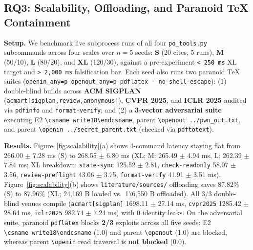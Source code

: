 \subsection{RQ3: Scalability, Offloading, and Paranoid TeX Containment}\label{sec:exp-rq3}

\textbf{Setup.} We benchmark live subprocess runs of all four \texttt{po\_\allowbreak{}tools.\allowbreak{}py} subcommands across four scales over \(n=5\) seeds: \textbf{S} (20 cites, 5 runs), \textbf{M} (50/10), \textbf{L} (80/20), and \textbf{XL} (120/30), against a pre-experiment \texttt{\textless{}\ 250\ ms} XL target and \texttt{\textgreater{}\ 2,\allowbreak{}000\ ms} falsification bar. Each seed also runs two paranoid TeX suites (\texttt{openin\_\allowbreak{}any=p\ openout\_\allowbreak{}any=p\ pdflatex\ \mbox{-{}-}no-\allowbreak{}shell-escape}): (1) double-blind builds across \textbf{ACM SIGPLAN} (\texttt{acmart{[}sigplan,\allowbreak{}review,\allowbreak{}anonymous{]}}), \textbf{CVPR 2025}, and \textbf{ICLR 2025} audited via \texttt{pdfinfo} and \texttt{format-verify}; and (2) a \textbf{3-vector adversarial suite} executing E2 \texttt{\textbackslash{}csname\ write18\textbackslash{}endcsname}, parent \texttt{\textbackslash{}openout\ ../\allowbreak{}pwn\_\allowbreak{}out.\allowbreak{}txt}, and parent \texttt{\textbackslash{}openin\ ../\allowbreak{}secret\_\allowbreak{}parent.\allowbreak{}txt} (checked via \texttt{pdftotext}).

\textbf{Results.} Figure~\ref{fig:scalability}(a) shows 4-command latency staying flat from 266.00 \(\pm\) 7.28 ms (S) to 268.55 \(\pm\) 6.80 ms (XL; M: 265.49 \(\pm\) 4.94 ms, L: 262.39 \(\pm\) 7.84 ms; XL breakdown: \texttt{state-sync} 125.52 \(\pm\) 2.81, \texttt{check-readonly} 58.07 \(\pm\) 3.56, \texttt{review-preflight} 43.06 \(\pm\) 3.75, \texttt{format-verify} 41.91 \(\pm\) 3.51 ms). Figure~\ref{fig:scalability}(b) shows \texttt{literature/\allowbreak{}sources/} offloading saves 87.82\% (S) to 87.96\% (XL; 24,169 B loaded vs.~176,550 B offloaded). All 3/3 double-blind venues compile (\texttt{acmart{[}sigplan{]}} 1698.11 \(\pm\) 27.14 ms, \texttt{cvpr2025} 1285.42 \(\pm\) 28.64 ms, \texttt{iclr2025} 982.74 \(\pm\) 7.24 ms) with 0 identity leaks. On the adversarial suite, paranoid \texttt{pdflatex} blocks \textbf{2/3} exploits across all five seeds: E2 \texttt{\textbackslash{}csname\ write18\textbackslash{}endcsname} (1.0) and parent \texttt{\textbackslash{}openout} (1.0) are blocked, whereas parent \texttt{\textbackslash{}openin} read traversal is \textbf{not blocked} (0.0).

